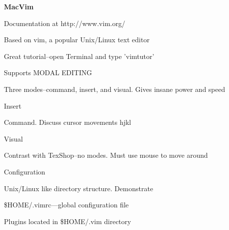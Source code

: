 \documentclass[12pt]{amsart}
\begin{document}
\begin{outline}
\begin{outline}
  \end{outline}

\item{\bf MacVim}
  \begin{outline}
  \item{ Documentation at http://www.vim.org/}
  \item{Based on vim, a popular Unix/Linux text editor}
  \item{ Great tutorial--open Terminal and type 'vimtutor' }
  \item{Supports MODAL EDITING }
    \begin{outline}
    \item{Three modes--command, insert, and visual. Gives insane
      power and speed }
      \begin{outline}
      \item{Insert }
      \item{ Command. Discuss cursor movements hjkl}
      \item{ Visual}

      \end{outline}
    \item{ Contrast with TexShop--no modes. Must use mouse to move
      around}

    \end{outline}
  \item{ Configuration}
    \begin{outline}
    \item{Unix/Linux like directory structure. Demonstrate }
    \item{ \$HOME/.vimrc---global configuration file}
    \item{ Plugins located in \$HOME/.vim directory}

    \end{outline}



\end{outline}
\end{outline}
\end{document}
